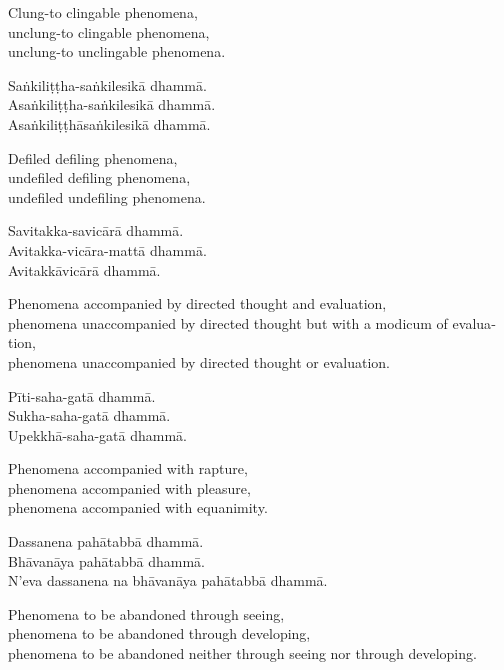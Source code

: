 \begin{english}
  Clung-to clingable phenomena,\\
  unclung-to clingable phenomena,\\
  unclung-to unclingable phenomena.
\end{english}

Saṅkiliṭṭha-saṅkilesikā dhammā.\\
Asaṅkiliṭṭha-saṅkilesikā dhammā.\\
Asaṅkiliṭṭhāsaṅkilesikā dhammā.

\begin{english}
  Defiled defiling phenomena,\\
  undefiled defiling phenomena,\\
  undefiled undefiling phenomena.
\end{english}

Savitakka-savicārā dhammā.\\
Avitakka-vicāra-mattā dhammā.\\
Avitakkāvicārā dhammā.

\begin{english}
  Phenomena accompanied by directed thought and evaluation,\\
  phenomena unaccompanied by directed thought but with a modicum of evaluation,\\
  phenomena unaccompanied by directed thought or evaluation.
\end{english}

Pīti-saha-gatā dhammā.\\
Sukha-saha-gatā dhammā.\\
Upekkhā-saha-gatā dhammā.

\begin{english}
  Phenomena accompanied with rapture,\\
  phenomena accompanied with pleasure,\\
  phenomena accompanied with equanimity.
\end{english}

Dassanena pahātabbā dhammā.\\
Bhāvanāya pahātabbā dhammā.\\
N'eva dassanena na bhāvanāya pahātabbā dhammā.

\begin{english}
  Phenomena to be abandoned through seeing,\\
  phenomena to be abandoned through developing,\\
  phenomena to be abandoned neither through seeing nor through developing.
\end{english}


